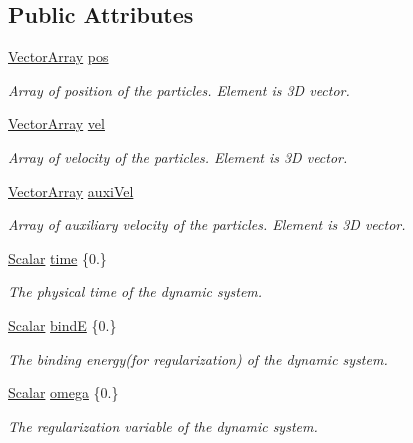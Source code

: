 \subsection*{Public Attributes}
\begin{DoxyCompactItemize}
\item 
\mbox{\hyperlink{class_g_a_r_a5818e17eb203504af6e10f38fc38d378}{Vector\+Array}} \mbox{\hyperlink{class_g_a_r_aec6b3fdb2c4dd7bdae27c0b41fbf6dda}{pos}}
\begin{DoxyCompactList}\small\item\em Array of position of the particles. Element is 3D vector. \end{DoxyCompactList}\item 
\mbox{\hyperlink{class_g_a_r_a5818e17eb203504af6e10f38fc38d378}{Vector\+Array}} \mbox{\hyperlink{class_g_a_r_a9619f6250eb37cb006bd508591f01997}{vel}}
\begin{DoxyCompactList}\small\item\em Array of velocity of the particles. Element is 3D vector. \end{DoxyCompactList}\item 
\mbox{\hyperlink{class_g_a_r_a5818e17eb203504af6e10f38fc38d378}{Vector\+Array}} \mbox{\hyperlink{class_g_a_r_ade7c1f936a5f23a0ded2d02b2cc750e6}{auxi\+Vel}}
\begin{DoxyCompactList}\small\item\em Array of auxiliary velocity of the particles. Element is 3D vector. \end{DoxyCompactList}\item 
\mbox{\hyperlink{class_g_a_r_a2ae44eda8e28d5dd26cf707dcda69314}{Scalar}} \mbox{\hyperlink{class_g_a_r_afaec5fb6242a3e5ae5cd368832cd1bb8}{time}} \{0.\}
\begin{DoxyCompactList}\small\item\em The physical time of the dynamic system. \end{DoxyCompactList}\item 
\mbox{\hyperlink{class_g_a_r_a2ae44eda8e28d5dd26cf707dcda69314}{Scalar}} \mbox{\hyperlink{class_g_a_r_a10f49216d9cacb2b21bd053a2ddb997c}{bindE}} \{0.\}
\begin{DoxyCompactList}\small\item\em The binding energy(for regularization) of the dynamic system. \end{DoxyCompactList}\item 
\mbox{\hyperlink{class_g_a_r_a2ae44eda8e28d5dd26cf707dcda69314}{Scalar}} \mbox{\hyperlink{class_g_a_r_a702f19b87d8754ac66914985d7c8229e}{omega}} \{0.\}
\begin{DoxyCompactList}\small\item\em The regularization variable of the dynamic system. \end{DoxyCompactList}\end{DoxyCompactItemize}


